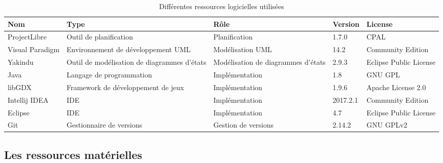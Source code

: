 \documentclass[]{article}
\newcommand{\placeholder}[1]{{\noindent \color{red}[ #1 ]}}
\begin{document}
\begin{table}[htbp]
\begin{center}
\begin{tabular}{|p{2cm}|p{5cm}|p{5cm}| p{1cm}| p{2cm}| }
\hline
Nom & Type & Rôle & Version & License \\
\hline\hline
ProjectLibre & Outil de planification & Planification & 1.7.0 & CPAL \\
\hline
Visual Paradigm  & Environnement de développement UML & Modélisation UML & 14.2 & Community Edition\\
\hline
Yakindu & Outil de modélisation de diagrammes d'états & Modélisation de diagrammes d'états  & 2.9.3 & Eclipse Public License    \\
\hline

Java  & Langage de programmation & Implémentation & 1.8 & GNU GPL \\
\hline

libGDX & Framework de développement de jeux & Implémentation & 1.9.6 & Apache License 2.0\\
\hline

Intellij IDEA & IDE & Implémentation & 2017.2.1 & Community Edition\\
\hline

Eclipse & IDE & Implémentation & 4.7 & Eclipse Public License\\
\hline

Git & Gestionnaire de versions & Gestion de versions & 2.14.2 & GNU GPLv2\\
\hline



\hline
\end{tabular}
\end{center}
   \caption{Différentes ressources logicielles utilisées}
   \label{tab:TEC}
\end{table}




\subsection{Les ressources matérielles}
\end{document}

